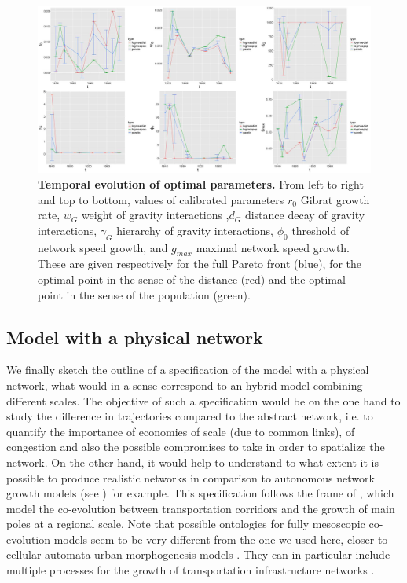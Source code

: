 \documentclass[11pt]{article}
\begin{document}
\begin{figure}
	\includegraphics[width=\linewidth]{figures/Fig7.jpg}
	\caption[Evolution of calibrated parameters]{\textbf{Temporal evolution of optimal parameters.} From left to right and top to bottom, values of calibrated parameters $r_0$ Gibrat growth rate, $w_G$ weight of gravity interactions ,$d_G$ distance decay of gravity interactions, $\gamma_G$ hierarchy of gravity interactions, $\phi_0$ threshold of network speed growth, and $g_{max}$ maximal network speed growth. These are given respectively for the full Pareto front (blue), for the optimal point in the sense of the distance (red) and the optimal point in the sense of the population (green). \label{fig:macrocoevol:parameters}}
\end{figure}


\subsection{Model with a physical network}


We finally sketch the outline of a specification of the model with a physical network, what would in a sense correspond to an hybrid model combining different scales. The objective of such a specification would be on the one hand to study the difference in trajectories compared to the abstract network, i.e. to quantify the importance of economies of scale (due to common links), of congestion and also the possible compromises to take in order to spatialize the network. On the other hand, it would help to understand to what extent it is possible to produce realistic networks in comparison to autonomous network growth models (see \cite{xie2009modeling}) for example. This specification follows the frame of \cite{li2014modeling}, which model the co-evolution between transportation corridors and the growth of main poles at a regional scale. Note that possible ontologies for fully mesoscopic co-evolution models seem to be very different from the one we used here, closer to cellular automata urban morphogenesis models \citep{2018arXiv180505195R}. They can in particular include multiple processes for the growth of transportation infrastructure networks \citep{raimbault2018multi}.
\end{document}
